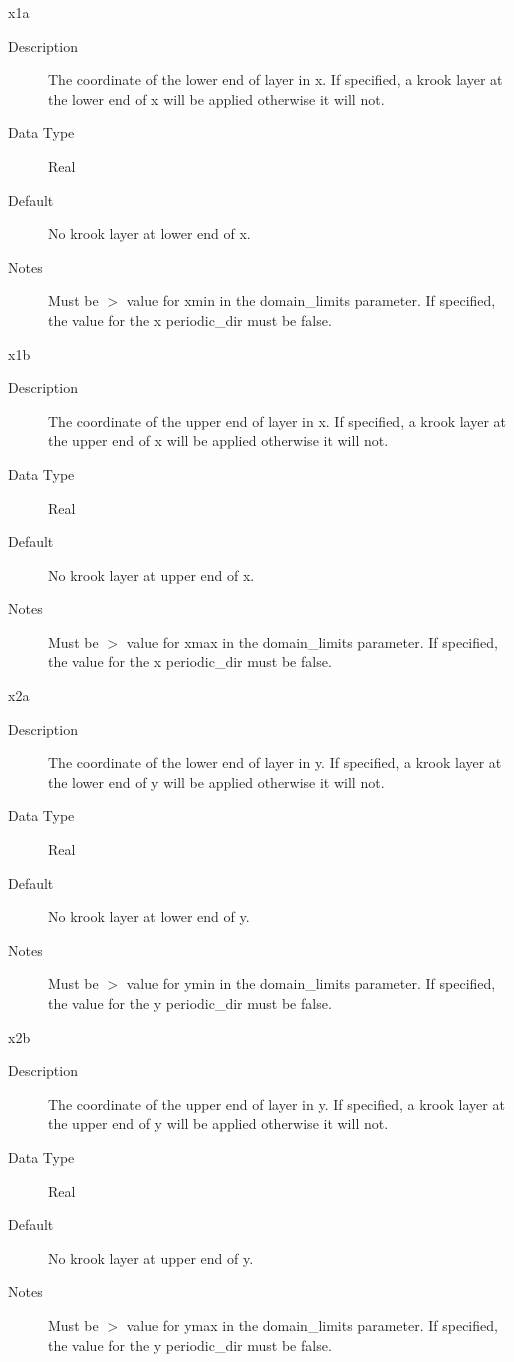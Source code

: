\documentclass[11pt]{amsart}
\begin{document}
x1a
\begin{description}
\item [Description] The coordinate of the lower end of layer in x.  If
specified, a krook layer at the lower end of x will be applied otherwise it
will not.
\item [Data Type] Real
\item [Default] No krook layer at lower end of x.
\item [Notes] Must be $>$ value for xmin in the domain\_limits parameter.  If
specified, the value for the x periodic\_dir must be false.
\end{description}

x1b
\begin{description}
\item [Description] The coordinate of the upper end of layer in x.  If
specified, a krook layer at the upper end of x will be applied otherwise it
will not.
\item [Data Type] Real
\item [Default] No krook layer at upper end of x.
\item [Notes] Must be $>$ value for xmax in the domain\_limits parameter.  If
specified, the value for the x periodic\_dir must be false.
\end{description}

x2a
\begin{description}
\item [Description] The coordinate of the lower end of layer in y.  If
specified, a krook layer at the lower end of y will be applied otherwise it
will not.
\item [Data Type] Real
\item [Default] No krook layer at lower end of y.
\item [Notes] Must be $>$ value for ymin in the domain\_limits parameter.  If
specified, the value for the y periodic\_dir must be false.
\end{description}

x2b
\begin{description}
\item [Description] The coordinate of the upper end of layer in y.  If
specified, a krook layer at the upper end of y will be applied otherwise it
will not.
\item [Data Type] Real
\item [Default] No krook layer at upper end of y.
\item [Notes] Must be $>$ value for ymax in the domain\_limits parameter.  If
specified, the value for the y periodic\_dir must be false.
\end{description}
\end{document}
